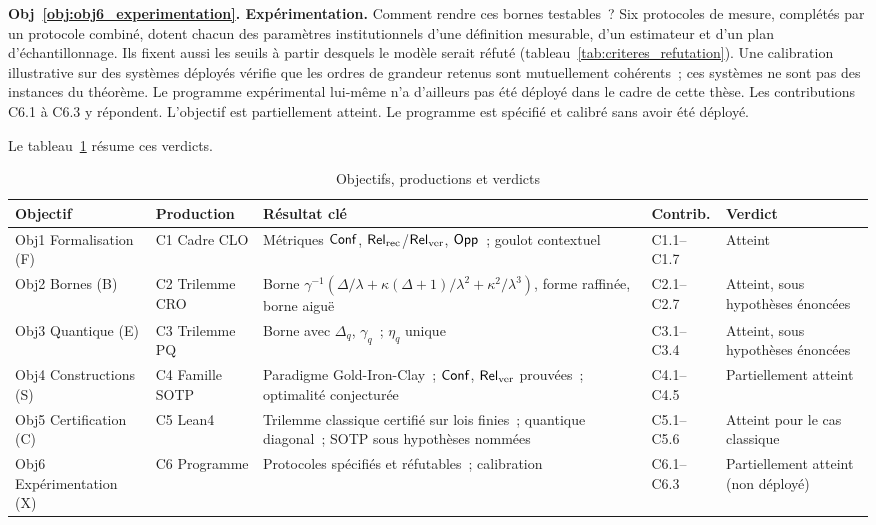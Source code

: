 \begin{sloppypar}
\textbf{Obj~\ref{obj:obj6_experimentation}. Exp\'erimentation.} Comment rendre
ces bornes testables~? Six protocoles de mesure, compl\'et\'es par un protocole combin\'e, dotent chacun des
param\`etres institutionnels d'une d\'efinition mesurable, d'un estimateur et
d'un plan d'\'echantillonnage. Ils fixent aussi les seuils \`a partir desquels le
mod\`ele serait r\'efut\'e (tableau~\ref{tab:criteres_refutation}). Une
calibration illustrative sur des syst\`emes d\'eploy\'es v\'erifie que les ordres de
grandeur retenus sont mutuellement coh\'erents~; ces syst\`emes ne sont pas des
instances du th\'eor\`eme. Le programme exp\'erimental lui-m\^eme n'a d'ailleurs pas \'et\'e
d\'eploy\'e dans le cadre de cette th\`ese. Les contributions C6.1 \`a C6.3 y r\'epondent.
L'objectif est partiellement atteint. Le programme est sp\'ecifi\'e et calibr\'e sans
avoir \'et\'e d\'eploy\'e.

Le tableau~\ref{tab:synthese_contributions} r\'esume ces verdicts.

\begin{table}[htbp]
\centering
\caption{Objectifs, productions et verdicts}
\label{tab:synthese_contributions}
\small
\begin{tabular}{@{}p{2.3cm}p{2.4cm}p{4.2cm}p{1.6cm}p{3.2cm}@{}}
\toprule
\textbf{Objectif} & \textbf{Production} & \textbf{R\'esultat cl\'e} & \textbf{Contrib.} & \textbf{Verdict} \\
\midrule
Obj1 Formalisation (F) & C1 Cadre CLO & M\'etriques $\mathsf{Conf}$, $\mathsf{Rel}_{\mathrm{rec}}$/$\mathsf{Rel}_{\mathrm{ver}}$, $\mathsf{Opp}$~; goulot contextuel & C1.1--C1.7 & Atteint \\
Obj2 Bornes (B) & C2 Trilemme CRO & Borne $\gamma^{-1}(\Delta/\lambda + \kappa(\Delta+1)/\lambda^2 + \kappa^2/\lambda^3)$, forme raffin\'ee, borne aigu\"e & C2.1--C2.7 & Atteint, sous hypoth\`eses \'enonc\'ees \\
Obj3 Quantique (E) & C3 Trilemme PQ & Borne avec $\Delta_q$, $\gamma_q$~; $\eta_q$ unique & C3.1--C3.4 & Atteint, sous hypoth\`eses \'enonc\'ees \\
Obj4 Constructions (S) & C4 Famille SOTP & Paradigme Gold-Iron-Clay~; $\mathsf{Conf}$, $\mathsf{Rel}_{\mathrm{ver}}$ prouv\'ees~; optimalit\'e conjectur\'ee & C4.1--C4.5 & Partiellement atteint \\
Obj5 Certification (C) & C5 Lean4 & Trilemme classique certifi\'e sur lois finies~; quantique diagonal~; SOTP sous hypoth\`eses nomm\'ees & C5.1--C5.6 & Atteint pour le cas classique \\
Obj6 Exp\'erimentation (X) & C6 Programme & Protocoles sp\'ecifi\'es et r\'efutables~; calibration & C6.1--C6.3 & Partiellement atteint (non d\'eploy\'e) \\
\bottomrule
\end{tabular}
\end{table}


\end{sloppypar}
